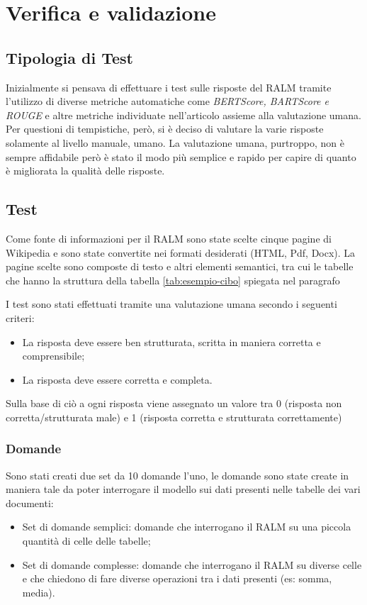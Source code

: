 \chapter{Verifica e validazione}
\label{cap:verifica-validazione}


\section{Tipologia di Test}
Inizialmente si pensava di effettuare i test sulle risposte del RALM tramite l'utilizzo di diverse metriche automatiche come \emph{BERTScore, BARTScore e ROUGE} e altre metriche individuate nell'articolo \cite{art:metriche} assieme alla valutazione umana.
Per questioni di tempistiche, però, si è deciso di valutare la varie risposte solamente al livello manuale, umano.
La valutazione umana, purtroppo, non è sempre affidabile però è stato il modo più semplice e rapido per capire di quanto è migliorata la qualità delle risposte.

\section{Test}
Come fonte di informazioni per il RALM sono state scelte cinque pagine di Wikipedia e sono state convertite nei formati desiderati (HTML, Pdf, Docx).
La pagine scelte sono composte di testo e altri elementi semantici, tra cui le tabelle che hanno la struttura della tabella \ref{tab:esempio-cibo} spiegata nel paragrafo 

I test sono stati effettuati tramite una valutazione umana secondo i seguenti criteri:
\begin{itemize}
    \item La risposta deve essere ben strutturata, scritta in maniera corretta e comprensibile;
    \item La risposta deve essere corretta e completa.
\end{itemize}

Sulla base di ciò a ogni risposta viene assegnato un valore tra 0 (risposta non corretta/strutturata male) e 1 (risposta corretta e strutturata correttamente)

\subsection{Domande}
Sono stati creati due set da 10 domande l'uno, le domande sono state create in maniera tale da poter interrogare il modello sui dati presenti nelle tabelle dei vari documenti:
\begin{itemize}
    \item Set di domande semplici: domande che interrogano il RALM su una piccola quantità di celle delle tabelle;
    \item Set di domande complesse: domande che interrogano il RALM su diverse celle e che chiedono di fare diverse operazioni tra i dati presenti (es: somma, media).
\end{itemize}

